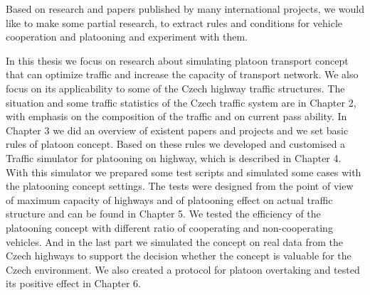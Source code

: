 Based on research and papers published by many international projects, we would like to make some partial research, to extract rules and conditions for vehicle cooperation and platooning and  experiment with them.

In this thesis we focus on research about simulating platoon transport concept that can optimize traffic and increase the capacity of transport network. We also focus on its applicability to some of the Czech highway traffic structures. The situation and some traffic statistics of the Czech traffic system are in Chapter 2, with emphasis on the composition of the traffic and on current pass ability.  In Chapter 3 we did an overview of existent papers and projects and we set basic rules of platoon concept. Based on these rules we developed and customised a Traffic simulator for platooning on highway, which is described in Chapter 4. With this simulator we prepared some test scripts and simulated some cases with the platooning concept settings. The tests were designed from the point of view of maximum capacity of highways and of platooning effect on actual traffic structure and can be found in Chapter 5. We tested the efficiency of the platooning concept with different ratio of cooperating and non-cooperating vehicles. And in the last part we simulated the concept on real data from the Czech highways to support the decision whether the concept is valuable for the Czech environment. We also created a protocol for platoon overtaking and tested its positive effect in Chapter 6.

